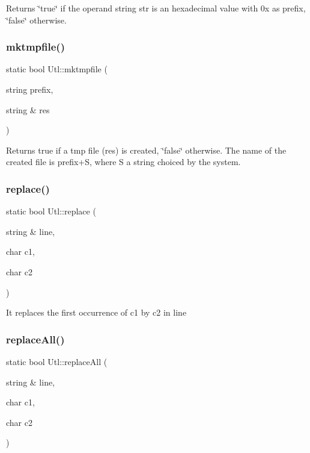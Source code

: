 \begin{DoxyReturn}{Returns}
\char`\"{}true\char`\"{} if the operand string str is an hexadecimal value with 0x as prefix, \char`\"{}false\char`\"{} otherwise. 
\end{DoxyReturn}
\mbox{\label{classUtl_a1f2b58b4443642b1102176d5a9cbd701}} 
\subsubsection{\texorpdfstring{mktmpfile()}{mktmpfile()}}
{\footnotesize\ttfamily static bool Utl\+::mktmpfile (\begin{DoxyParamCaption}\item[{string}]{prefix,  }\item[{string \&}]{res }\end{DoxyParamCaption})\hspace{0.3cm}{\ttfamily [static]}}

\begin{DoxyReturn}{Returns}
true if a tmp file (res) is created, \char`\"{}false\char`\"{} otherwise. The name of the created file is prefix+S, where S a string choiced by the system. 
\end{DoxyReturn}
\mbox{\label{classUtl_a4355032aa27e40814e621559f4bf509e}} 
\subsubsection{\texorpdfstring{replace()}{replace()}}
{\footnotesize\ttfamily static bool Utl\+::replace (\begin{DoxyParamCaption}\item[{string \&}]{line,  }\item[{char}]{c1,  }\item[{char}]{c2 }\end{DoxyParamCaption})\hspace{0.3cm}{\ttfamily [static]}}

It replaces the first occurrence of c1 by c2 in line \mbox{\label{classUtl_a83ad6ff53129a2d3ffae14df4d2c2d9d}} 
\subsubsection{\texorpdfstring{replace\+All()}{replaceAll()}}
{\footnotesize\ttfamily static bool Utl\+::replace\+All (\begin{DoxyParamCaption}\item[{string \&}]{line,  }\item[{char}]{c1,  }\item[{char}]{c2 }\end{DoxyParamCaption})\hspace{0.3cm}{\ttfamily [static]}}


